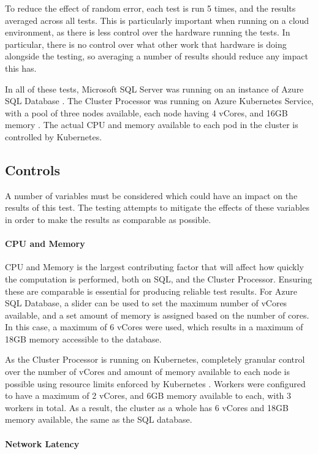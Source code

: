 To reduce the effect of random error, each test is run 5 times, and the results averaged across all tests. This is particularly important when running on a cloud environment, as there is less control over the hardware running the tests. In particular, there is no control over what other work that hardware is doing alongside the testing, so averaging a number of results should reduce any impact this has.

In all of these tests, Microsoft SQL Server was running on an instance of Azure SQL Database \cite{azuresqldatabase}. The Cluster Processor was running on Azure Kubernetes Service, with a pool of three nodes available, each node having 4 vCores, and 16GB memory \cite{azurekubernetesservice}. The actual CPU and memory available to each pod in the cluster is controlled by Kubernetes.

\subsection{Controls}
A number of variables must be considered which could have an impact on the results of this test. The testing attempts to mitigate the effects of these variables in order to make the results as comparable as possible.

\paragraph{CPU and Memory}
CPU and Memory is the largest contributing factor that will affect how quickly the computation is performed, both on SQL, and the Cluster Processor. Ensuring these are comparable is essential for producing reliable test results. For Azure SQL Database, a slider can be used to set the maximum number of vCores available, and a set amount of memory is assigned based on the number of cores. In this case, a maximum of 6 vCores were used, which results in a maximum of 18GB memory accessible to the database.

As the Cluster Processor is running on Kubernetes, completely granular control over the number of vCores and amount of memory available to each node is possible using resource limits enforced by Kubernetes \cite{k8sapi}. Workers were configured to have a maximum of 2 vCores, and 6GB memory available to each, with 3 workers in total. As a result, the cluster as a whole has 6 vCores and 18GB memory available, the same as the SQL database.

\paragraph{Network Latency}


